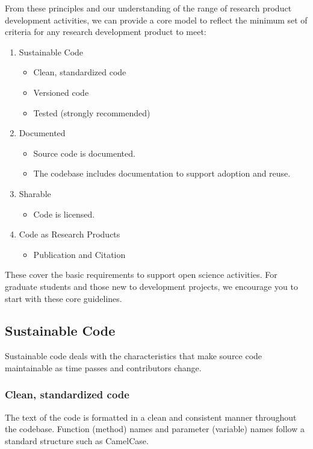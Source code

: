 \documentclass{article}
\newcounter{subsubsubsection}[subsubsection]
\begin{document}
From these principles and our understanding of the range of research product development activities, we can provide a core model to reflect the minimum set of criteria for any research development product to meet:
\begin{enumerate}
\item Sustainable Code
\begin{itemize}
\item Clean, standardized code
\item Versioned code
\item Tested (strongly recommended)
\end{itemize}
\item Documented
\begin{itemize}
\item Source code is documented.
\item The codebase includes documentation to support adoption and reuse.
\end{itemize}
\item Sharable
\begin{itemize}
\item Code is licensed.
\end{itemize}
\item Code as Research Products
\begin{itemize}
\item Publication and Citation
\end{itemize}
\end{enumerate}

These cover the basic requirements to support open science activities. For graduate students and those new to development projects, we encourage you to start with these core guidelines.

\subsection{Sustainable Code}
Sustainable code deals with the characteristics that make source code maintainable as time passes and contributors change.

\subsubsection{Clean, standardized code}
The text of the code is formatted in a clean and consistent manner throughout the codebase. Function (method) names and parameter (variable) names follow a standard structure such as CamelCase. 
\end{document}
